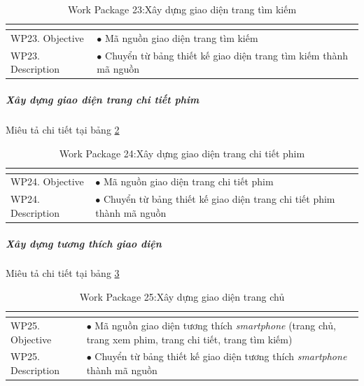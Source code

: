 \documentclass[a4paper]{book}
\begin{document}
\begin{table}[h!]
	\begin{center}
		\begin{tabular}{|p{4cm}|p{10cm}|}
			\hline
			\multicolumn{2}{|c|}{\cellcolor[HTML]{363636}{\color[HTML]{FFFFFF}Work package 23: Xây dựng giao diện trang tìm kiếm}}\\
			\hline
			\multirow{1}{*}{WP23. Objective} & $\bullet$ Mã nguồn giao diện trang tìm kiếm\\
			\hline
			\multirow{1}{*}{WP23. Description} & $\bullet$ Chuyển từ bảng thiết kế giao diện trang tìm kiếm thành mã nguồn \\
			\hline
		\end{tabular}
		\caption{Work Package 23:Xây dựng giao diện trang tìm kiếm}
		\label{table:frontend_xd_gd_timkiem}
	\end{center}
\end{table}
\subparagraph{Xây dựng giao diện trang chi tiết phim} Miêu tả chi tiết tại bảng \ref{table:frontend_xd_gd_chitiet}
\begin{table}[h!]
	\begin{center}
		\begin{tabular}{|p{4cm}|p{10cm}|}
			\hline
			\multicolumn{2}{|c|}{\cellcolor[HTML]{363636}{\color[HTML]{FFFFFF}Work package 24: Xây dựng giao diện trang chi tiết phim}}\\
			\hline
			\multirow{1}{*}{WP24. Objective} & $\bullet$ Mã nguồn giao diện trang chi tiết phim\\
			\hline
			\multirow{1}{*}{WP24. Description} & $\bullet$ Chuyển từ bảng thiết kế giao diện trang chi tiết phim thành mã nguồn \\
			\hline
		\end{tabular}
		\caption{Work Package 24:Xây dựng giao diện trang chi tiết phim}
		\label{table:frontend_xd_gd_chitiet}
	\end{center}
\end{table}
\subparagraph{Xây dựng tương thích giao diện} Miêu tả chi tiết tại bảng \ref{table:frontend_xd_gd_tuongthich}
\begin{table}[h!]
	\begin{center}
		\begin{tabular}{|p{4cm}|p{10cm}|}
			\hline
			\multicolumn{2}{|c|}{\cellcolor[HTML]{363636}{\color[HTML]{FFFFFF}Work package 25: Xây dựng giao diện tương thích smartphone}}\\
			\hline
			\multirow{1}{*}{WP25. Objective} & $\bullet$ Mã nguồn giao diện tương thích \textit{smartphone} (trang chủ, trang xem phim, trang chi tiết, trang tìm kiếm)\\
			\hline
			\multirow{1}{*}{WP25. Description} & $\bullet$ Chuyển từ bảng thiết kế giao diện tương thích \textit{smartphone} thành mã nguồn \\
			\hline
		\end{tabular}
		\caption{Work Package 25:Xây dựng giao diện trang chủ}
		\label{table:frontend_xd_gd_tuongthich}
	\end{center}
\end{table}
\end{document}
